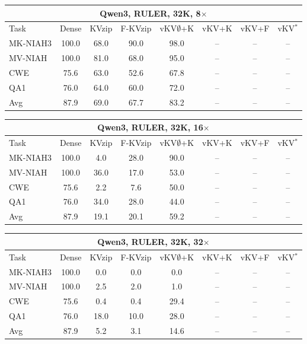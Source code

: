 \begin{tabular}{lccccccc}
\toprule
\multicolumn{8}{c}{Qwen3, RULER, 32K, 8$\times$} \\
\midrule
Task & Dense & KVzip & F-KVzip & vKV$\emptyset$+K & vKV+K & vKV+F & vKV$^\ast$ \\
\midrule
MK-NIAH3 & 100.0 & 68.0 & 90.0 & 98.0 & -- & -- & -- \\
MV-NIAH & 100.0 & 81.0 & 68.0 & 95.0 & -- & -- & -- \\
CWE & 75.6 & 63.0 & 52.6 & 67.8 & -- & -- & -- \\
QA1 & 76.0 & 64.0 & 60.0 & 72.0 & -- & -- & -- \\
\midrule
Avg & 87.9 & 69.0 & 67.7 & 83.2 & -- & -- & -- \\
\bottomrule
\end{tabular}
\vspace{0.8em}

\begin{tabular}{lccccccc}
\toprule
\multicolumn{8}{c}{Qwen3, RULER, 32K, 16$\times$} \\
\midrule
Task & Dense & KVzip & F-KVzip & vKV$\emptyset$+K & vKV+K & vKV+F & vKV$^\ast$ \\
\midrule
MK-NIAH3 & 100.0 & 4.0 & 28.0 & 90.0 & -- & -- & -- \\
MV-NIAH & 100.0 & 36.0 & 17.0 & 53.0 & -- & -- & -- \\
CWE & 75.6 & 2.2 & 7.6 & 50.0 & -- & -- & -- \\
QA1 & 76.0 & 34.0 & 28.0 & 44.0 & -- & -- & -- \\
\midrule
Avg & 87.9 & 19.1 & 20.1 & 59.2 & -- & -- & -- \\
\bottomrule
\end{tabular}
\vspace{0.8em}

\begin{tabular}{lccccccc}
\toprule
\multicolumn{8}{c}{Qwen3, RULER, 32K, 32$\times$} \\
\midrule
Task & Dense & KVzip & F-KVzip & vKV$\emptyset$+K & vKV+K & vKV+F & vKV$^\ast$ \\
\midrule
MK-NIAH3 & 100.0 & 0.0 & 0.0 & 0.0 & -- & -- & -- \\
MV-NIAH & 100.0 & 2.5 & 2.0 & 1.0 & -- & -- & -- \\
CWE & 75.6 & 0.4 & 0.4 & 29.4 & -- & -- & -- \\
QA1 & 76.0 & 18.0 & 10.0 & 28.0 & -- & -- & -- \\
\midrule
Avg & 87.9 & 5.2 & 3.1 & 14.6 & -- & -- & -- \\
\bottomrule
\end{tabular}
\vspace{0.8em}

